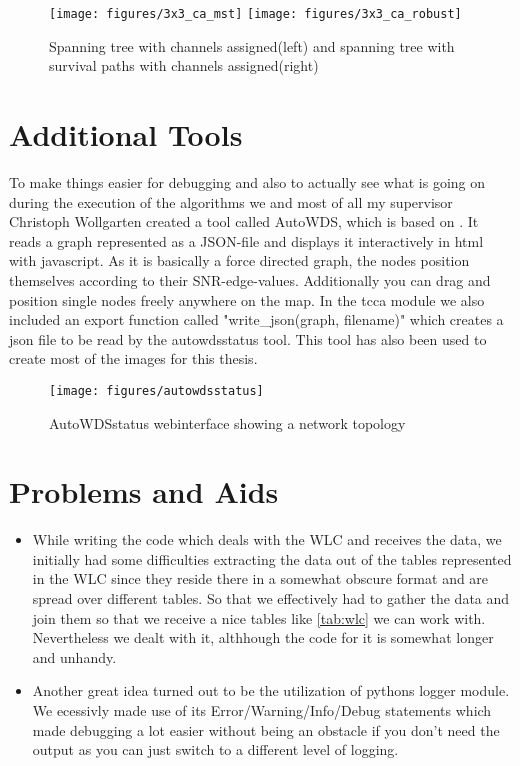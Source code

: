     \begin{figure}[t]
      \centering
      \texttt{[image: figures/3x3\_ca\_mst]}
      \texttt{[image: figures/3x3\_ca\_robust]}
      \caption{Spanning tree with channels assigned(left) and spanning tree with survival paths with channels assigned(right)}
      \label{fig:3x3third}
    \end{figure}
\section{Additional Tools}
  To make things easier for debugging and also to actually see what is going on during the execution of the algorithms we and most of all my supervisor Christoph
  Wollgarten created a tool called AutoWDS, which is based on \cite{d3js}. It reads a graph represented as a \ac{JSON}-file and displays it interactively in html with javascript.
  As it is basically a force directed graph, the nodes position themselves according to their SNR-edge-values. Additionally you can drag and position single nodes freely
  anywhere on the map.
  In the tcca module we also included an export function called "write\_json(graph, filename)" which creates a json file to be read by the autowdsstatus tool.
  This tool has also been used to create most of the images for this thesis.
  
  \begin{figure}[t]
    \centering
    \texttt{[image: figures/autowdsstatus]}
    \caption{AutoWDSstatus webinterface showing a network topology}
    \label{fig:autowdsstatus}
  \end{figure}
  
\section{Problems and Aids}
\begin{itemize}

 \item While writing the code which deals with the WLC and receives the data, we initially had some difficulties extracting the data out of the tables represented in the WLC since
    they reside there in a somewhat obscure format and are spread over different tables. So that we effectively had to gather the data and join them so that we receive a
    nice tables like \ref{tab:wlc} we can work with. Nevertheless we dealt with it, althhough the code for it is somewhat longer and unhandy.

  \item Another great idea turned out to be the utilization of pythons logger module. We ecessivly made use of its Error/Warning/Info/Debug statements which made debugging
  a lot easier without being an obstacle if you don't need the output as you can just switch to a different level of logging.
\end{itemize}
  
